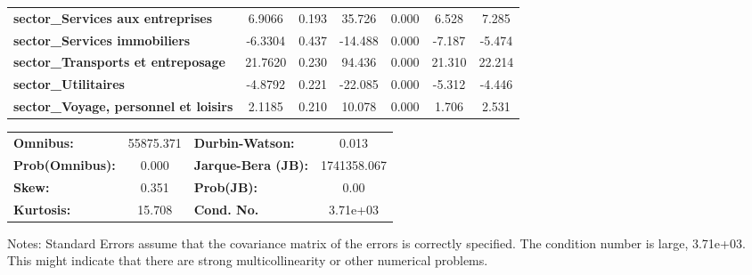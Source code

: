 \begin{center}
\begin{tabular}{lcccccc}
\textbf{sector\_Services aux entreprises}                             &       6.9066  &        0.193     &    35.726  &         0.000        &        6.528    &        7.285     \\
\textbf{sector\_Services immobiliers}                                 &      -6.3304  &        0.437     &   -14.488  &         0.000        &       -7.187    &       -5.474     \\
\textbf{sector\_Transports et entreposage}                            &      21.7620  &        0.230     &    94.436  &         0.000        &       21.310    &       22.214     \\
\textbf{sector\_Utilitaires}                                          &      -4.8792  &        0.221     &   -22.085  &         0.000        &       -5.312    &       -4.446     \\
\textbf{sector\_Voyage, personnel et loisirs}                         &       2.1185  &        0.210     &    10.078  &         0.000        &        1.706    &        2.531     \\
\bottomrule
\end{tabular}
\begin{tabular}{lclc}
\textbf{Omnibus:}       & 55875.371 & \textbf{  Durbin-Watson:     } &      0.013   \\
\textbf{Prob(Omnibus):} &    0.000  & \textbf{  Jarque-Bera (JB):  } & 1741358.067  \\
\textbf{Skew:}          &    0.351  & \textbf{  Prob(JB):          } &       0.00   \\
\textbf{Kurtosis:}      &   15.708  & \textbf{  Cond. No.          } &   3.71e+03   \\
\bottomrule
\end{tabular}
\end{center}

Notes: \newline
 [1] Standard Errors assume that the covariance matrix of the errors is correctly specified. \newline
 [2] The condition number is large, 3.71e+03. This might indicate that there are \newline
 strong multicollinearity or other numerical problems.